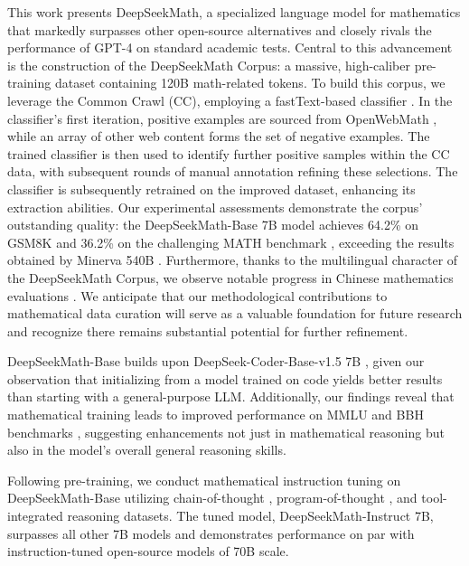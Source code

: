 This work presents DeepSeekMath, a specialized language model for mathematics that markedly surpasses other open-source alternatives and closely rivals the performance of GPT-4 on standard academic tests. Central to this advancement is the construction of the DeepSeekMath Corpus: a massive, high-caliber pre-training dataset containing 120B math-related tokens. To build this corpus, we leverage the Common Crawl (CC), employing a fastText-based classifier \citep{joulin2016fasttext}. In the classifier’s first iteration, positive examples are sourced from OpenWebMath \citep{openwebmath}, while an array of other web content forms the set of negative examples. The trained classifier is then used to identify further positive samples within the CC data, with subsequent rounds of manual annotation refining these selections. The classifier is subsequently retrained on the improved dataset, enhancing its extraction abilities. Our experimental assessments demonstrate the corpus’ outstanding quality: the DeepSeekMath-Base 7B model achieves 64.2\% on GSM8K \citep{gsm8k} and 36.2\% on the challenging MATH benchmark \citep{MATH}, exceeding the results obtained by Minerva 540B \citep{minerva}. Furthermore, thanks to the multilingual character of the DeepSeekMath Corpus, we observe notable progress in Chinese mathematics evaluations \citep{wei2023cmath,agieval}. We anticipate that our methodological contributions to mathematical data curation will serve as a valuable foundation for future research and recognize there remains substantial potential for further refinement.

DeepSeekMath-Base builds upon DeepSeek-Coder-Base-v1.5 7B \citep{deepseek-coder}, given our observation that initializing from a model trained on code yields better results than starting with a general-purpose LLM. Additionally, our findings reveal that mathematical training leads to improved performance on MMLU \citep{mmlu} and BBH benchmarks \citep{bbh}, suggesting enhancements not just in mathematical reasoning but also in the model's overall general reasoning skills.

Following pre-training, we conduct mathematical instruction tuning on DeepSeekMath-Base utilizing chain-of-thought \citep{cot}, program-of-thought \citep{pot,pal}, and tool-integrated reasoning \citep{tora} datasets. The tuned model, DeepSeekMath-Instruct 7B, surpasses all other 7B models and demonstrates performance on par with instruction-tuned open-source models of 70B scale.

